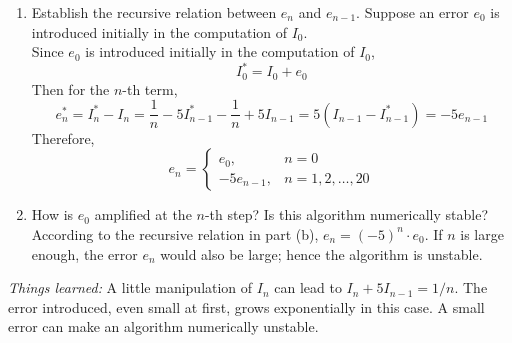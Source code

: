 \documentclass[10pt]{report}
\begin{document}
\begin{enumerate}
\begin{enumerate}
		\item 
		Establish the recursive relation between $e_n$ and $e_{n-1}$. Suppose an error $e_0$ is introduced initially in the computation of $I_0$.
		\\
		Since $e_0$ is introduced initially in the computation of $I_0$,
		\[
		I_0^* = I_0 + e_0
		\]
		Then for the $n$-th term,
		\[
		e_n^* 
		= I_n^* - I_n 
		= \frac{1}{n} - 5I_{n-1}^* - \frac{1}{n} + 5I_{n-1}
		= 5(I_{n-1} - I_{n-1}^*)
		= -5e_{n-1}
		\]
		Therefore, 
		\[
		e_n = \begin{cases}
		e_0, &n=0\\
		-5e_{n-1}, &n=1,2,\dots,20
		\end{cases}
		\]
		
		\item 
		How is $e_0$ amplified at the $n$-th step? Is this algorithm numerically stable?
		\\
		According to the recursive relation in part (b), $e_n = (-5)^n\cdot e_0$. If $n$ is large enough, the error $e_n$ would also be large; hence the algorithm is unstable.
	\end{enumerate}
	\textit{Things learned:} A little manipulation of $I_n$ can lead to $I_n+5I_{n-1}=1/n$. The error introduced, even small at first, grows exponentially in this case. A small error can make an algorithm numerically unstable. 
\end{enumerate}
\end{document}
